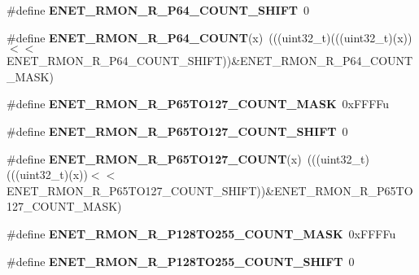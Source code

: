 \begin{DoxyCompactItemize}
\item 
\#define {\bfseries E\+N\+E\+T\+\_\+\+R\+M\+O\+N\+\_\+\+R\+\_\+\+P64\+\_\+\+C\+O\+U\+N\+T\+\_\+\+S\+H\+I\+FT}~0\hypertarget{group__ENET__Register__Masks_gaf011d25e6625c11c485b9081f2b9a611}{}\label{group__ENET__Register__Masks_gaf011d25e6625c11c485b9081f2b9a611}

\item 
\#define {\bfseries E\+N\+E\+T\+\_\+\+R\+M\+O\+N\+\_\+\+R\+\_\+\+P64\+\_\+\+C\+O\+U\+NT}(x)~(((uint32\+\_\+t)(((uint32\+\_\+t)(x))$<$$<$E\+N\+E\+T\+\_\+\+R\+M\+O\+N\+\_\+\+R\+\_\+\+P64\+\_\+\+C\+O\+U\+N\+T\+\_\+\+S\+H\+I\+FT))\&E\+N\+E\+T\+\_\+\+R\+M\+O\+N\+\_\+\+R\+\_\+\+P64\+\_\+\+C\+O\+U\+N\+T\+\_\+\+M\+A\+SK)\hypertarget{group__ENET__Register__Masks_ga8504b7e1afe4a8f7f4d660ce32a0bb60}{}\label{group__ENET__Register__Masks_ga8504b7e1afe4a8f7f4d660ce32a0bb60}

\item 
\#define {\bfseries E\+N\+E\+T\+\_\+\+R\+M\+O\+N\+\_\+\+R\+\_\+\+P65\+T\+O127\+\_\+\+C\+O\+U\+N\+T\+\_\+\+M\+A\+SK}~0x\+F\+F\+F\+Fu\hypertarget{group__ENET__Register__Masks_ga2a632b9df359a8efad215ab90dc33157}{}\label{group__ENET__Register__Masks_ga2a632b9df359a8efad215ab90dc33157}

\item 
\#define {\bfseries E\+N\+E\+T\+\_\+\+R\+M\+O\+N\+\_\+\+R\+\_\+\+P65\+T\+O127\+\_\+\+C\+O\+U\+N\+T\+\_\+\+S\+H\+I\+FT}~0\hypertarget{group__ENET__Register__Masks_gac93f4bae8a600e98833a132aa02065a0}{}\label{group__ENET__Register__Masks_gac93f4bae8a600e98833a132aa02065a0}

\item 
\#define {\bfseries E\+N\+E\+T\+\_\+\+R\+M\+O\+N\+\_\+\+R\+\_\+\+P65\+T\+O127\+\_\+\+C\+O\+U\+NT}(x)~(((uint32\+\_\+t)(((uint32\+\_\+t)(x))$<$$<$E\+N\+E\+T\+\_\+\+R\+M\+O\+N\+\_\+\+R\+\_\+\+P65\+T\+O127\+\_\+\+C\+O\+U\+N\+T\+\_\+\+S\+H\+I\+FT))\&E\+N\+E\+T\+\_\+\+R\+M\+O\+N\+\_\+\+R\+\_\+\+P65\+T\+O127\+\_\+\+C\+O\+U\+N\+T\+\_\+\+M\+A\+SK)\hypertarget{group__ENET__Register__Masks_ga38f2ba6958a5e0b6b5b4d147037e0c78}{}\label{group__ENET__Register__Masks_ga38f2ba6958a5e0b6b5b4d147037e0c78}

\item 
\#define {\bfseries E\+N\+E\+T\+\_\+\+R\+M\+O\+N\+\_\+\+R\+\_\+\+P128\+T\+O255\+\_\+\+C\+O\+U\+N\+T\+\_\+\+M\+A\+SK}~0x\+F\+F\+F\+Fu\hypertarget{group__ENET__Register__Masks_ga2d2913a282b447ccbf47ab61daa15197}{}\label{group__ENET__Register__Masks_ga2d2913a282b447ccbf47ab61daa15197}

\item 
\#define {\bfseries E\+N\+E\+T\+\_\+\+R\+M\+O\+N\+\_\+\+R\+\_\+\+P128\+T\+O255\+\_\+\+C\+O\+U\+N\+T\+\_\+\+S\+H\+I\+FT}~0\hypertarget{group__ENET__Register__Masks_gad89a09873f7fb8686264696f1bf396ea}{}\label{group__ENET__Register__Masks_gad89a09873f7fb8686264696f1bf396ea}


\end{DoxyCompactItemize}
